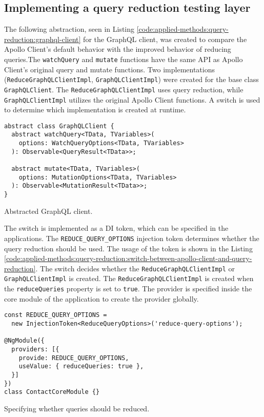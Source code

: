 \subsection{Implementing a query reduction testing layer}\label{subsection:applied-methods:query-reduction:testing-query-reduction}

The following abstraction, seen in Listing \ref{code:applied-methods:query-reduction:graphql-client} for the GraphQL client, was created to compare the Apollo Client's default behavior with the improved behavior of reducing queries.The \texttt{watchQuery} and \texttt{mutate} functions have the same \ac{API} as Apollo Client's original query and mutate functions. Two implementations (\texttt{ReduceGraphQLClientImpl}, \texttt{GraphQLClientImpl}) were created for the base class \texttt{GraphQLClient}. The \texttt{ReduceGraphQLClientImpl} uses query reduction, while \texttt{GraphQLClientImpl} utilizes the original Apollo Client functions. A switch is used to determine which implementation is created at runtime.

\ifshowListings
\begin{listing}[H]
\begin{verbatim}
abstract class GraphQLClient {
  abstract watchQuery<TData, TVariables>(
    options: WatchQueryOptions<TData, TVariables>
  ): Observable<QueryResult<TData>>;

  abstract mutate<TData, TVariables>(
    options: MutationOptions<TData, TVariables>
  ): Observable<MutationResult<TData>>;
}
\end{verbatim}
\caption{Abstracted GraphQL client.}\label{code:applied-methods:query-reduction:graphql-client}
\end{listing}
\fi

\noindent The switch is implemented as a \ac{DI} token, which can be specified in the applications. The \texttt{REDUCE\_QUERY\_OPTIONS} injection token determines whether the query reduction should be used. The usage of the token is shown in the Listing \ref{code:applied-methods:query-reduction:switch-between-apollo-client-and-query-reduction}. The switch decides whether the \texttt{ReduceGraphQLClientImpl} or \texttt{GraphQLClientImpl} is created. The \texttt{ReduceGraphQLClientImpl} is created when the \texttt{reduceQueries} property is set to \texttt{true}. The provider is specified inside the core module of the application to create the provider globally.

\ifshowListings
\begin{listing}[H]
\begin{verbatim}
const REDUCE_QUERY_OPTIONS = 
  new InjectionToken<ReduceQueryOptions>('reduce-query-options');

@NgModule({
  providers: [{
    provide: REDUCE_QUERY_OPTIONS,
    useValue: { reduceQueries: true },
  }]
})
class ContactCoreModule {}
\end{verbatim}
\caption{Specifying whether queries should be reduced.}\label{code:applied-methods:query-reduction:switch-between-apollo-client-and-query-reduction}
\end{listing}
\fi

